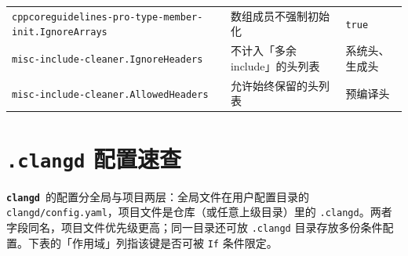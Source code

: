 \documentclass[12pt,a4paper,fontset=fandol]{ctexbook}
\newcommand{\Bk}{\discretionary{}{}{}}
\newcommand{\Lib}[1]{\textbf{\texttt{#1}}}
\newcommand{\CD}{\Lib{clangd}}
\begin{document}
{\begin{longtable}{@{}>{\raggedright\arraybackslash}p{}
                  >{\raggedright\arraybackslash}p{}
                  >{\raggedright\arraybackslash}p{}@{}}
\texttt{cppcoreguidelines-pro-type-\allowbreak member-init.IgnoreArrays} & 数组成员不强制初始化 & \texttt{true} \\
\texttt{misc-include-cleaner.\allowbreak IgnoreHeaders} & 不计入「多余 include」的头列表 & 系统头、生成头 \\
\texttt{misc-include-cleaner.\allowbreak AllowedHeaders} & 允许始终保留的头列表 & 预编译头 \\
\end{longtable}
}

\section{\texttt{.clangd} 配置速查}\label{sec:appA-s4}

\CD\ 的配置分全局与项目两层：全局文件在用户配置目录的 \texttt{clangd/{\Bk}\allowbreak config.yaml}，项目文件是仓库（或任意上级目录）里的 \texttt{.clangd}。两者字段同名，项目文件优先级更高；同一目录还可放 \texttt{.clangd} 目录存放多份条件配置。下表的「作用域」列指该键是否可被 \texttt{If} 条件限定。
\end{document}
